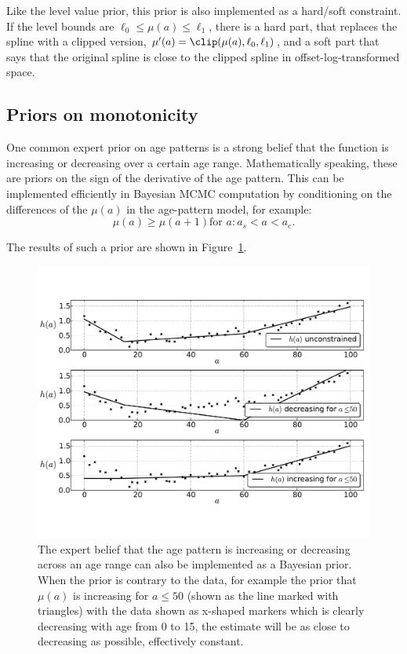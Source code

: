 Like the level value prior, this prior is also implemented as a
hard/soft constraint.  If the level bounds are $\ell_0 \leq \mu(a)
\leq \ell_1$, there is a hard part, that replaces the spline with a
clipped version, $\mu'(a) = \clip(\mu(a), \ell_0, \ell_1)$, and a
soft part that says that the original spline is close to the clipped
spline in offset-log-transformed space.

\subsection{Priors on monotonicity}

One common expert prior on age patterns is a strong belief that the
function is increasing or decreasing over a certain age
range. Mathematically speaking, these are priors on the sign of the
derivative of the age pattern.  This can be implemented efficiently in
Bayesian MCMC computation by conditioning on the differences of the
$\mu(a)$ in the age-pattern model, for example:
\[
\mu(a) \geq \mu(a+1) \text{for } a : a_s < a < a_e.
\]

The results of such a prior are shown in
Figure~\ref{monotone-age-pattern}.


\begin{figure}[h]
\begin{center}
\includegraphics[width=\textwidth]{monotone-smoothing-splines.pdf}
\caption{The expert belief that the age pattern
is increasing or decreasing across an age range can also be
implemented as a Bayesian prior.  When the prior is contrary to the
data, for example the prior that $\mu(a)$ is increasing for $a \leq
50$ (shown as the line marked with triangles) with the data shown as
x-shaped markers which is clearly decreasing with age from 0 to 15,
the estimate will be as close to decreasing as possible, effectively
constant.}
\label{monotone-age-pattern}
\end{center}
\end{figure}


